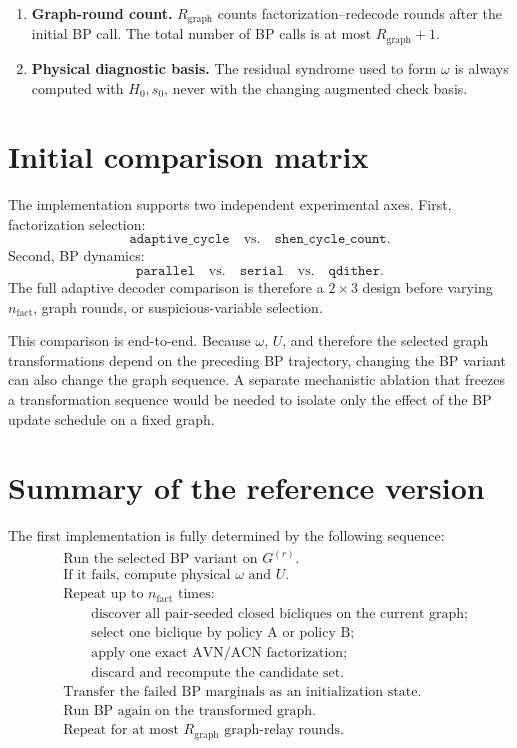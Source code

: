 \documentclass[11pt,a4paper]{article}
\begin{document}
\begin{enumerate}[leftmargin=2em]
\item \textbf{Graph-round count.}
      $R_{\mathrm{graph}}$ counts factorization--redecode rounds after the
      initial BP call. The total number of BP calls is at most
      $R_{\mathrm{graph}}+1$.

\item \textbf{Physical diagnostic basis.}
      The residual syndrome used to form $\omega$ is always computed with
      $H_0,s_0$, never with the changing augmented check basis.
\end{enumerate}

\section{Initial comparison matrix}

The implementation supports two independent experimental axes. First,
factorization selection:
\[
\texttt{adaptive\_cycle}
\quad\text{vs.}\quad
\texttt{shen\_cycle\_count}.
\]
Second, BP dynamics:
\[
\texttt{parallel}
\quad\text{vs.}\quad
\texttt{serial}
\quad\text{vs.}\quad
\texttt{qdither}.
\]
The full adaptive decoder comparison is therefore a $2\times3$ design before
varying $n_{\mathrm{fact}}$, graph rounds, or suspicious-variable selection.

This comparison is end-to-end. Because $\omega$, $U$, and therefore the
selected graph transformations depend on the preceding BP trajectory, changing
the BP variant can also change the graph sequence. A separate mechanistic
ablation that freezes a transformation sequence would be needed to isolate
only the effect of the BP update schedule on a fixed graph.

\section{Summary of the reference version}

The first implementation is fully determined by the following sequence:
\[
\boxed{
\begin{aligned}
&\text{Run the selected BP variant on }G^{(r)}.\\
&\text{If it fails, compute physical }\omega\text{ and }U.\\
&\text{Repeat up to }n_{\mathrm{fact}}\text{ times:}\\
&\qquad
\text{discover all pair-seeded closed bicliques on the current graph;}\\
&\qquad
\text{select one biclique by policy A or policy B;}\\
&\qquad
\text{apply one exact AVN/ACN factorization;}\\
&\qquad
\text{discard and recompute the candidate set.}\\
&\text{Transfer the failed BP marginals as an initialization state.}\\
&\text{Run BP again on the transformed graph.}\\
&\text{Repeat for at most }R_{\mathrm{graph}}\text{ graph-relay rounds.}
\end{aligned}
}
\]
\end{document}
